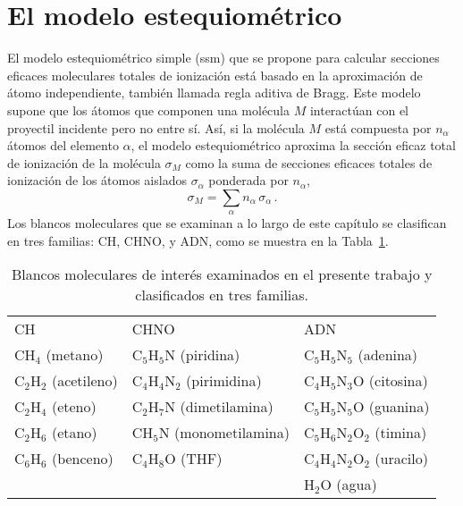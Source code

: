 \section{El modelo estequiométrico}
\label{sec:SSM}

El modelo estequiométrico simple (\acs{ssm}) que se propone para 
calcular secciones eficaces moleculares totales de ionización está 
basado en la aproximación de átomo independiente, también llamada regla 
aditiva de Bragg. Este modelo supone que los átomos que componen una 
molécula $M$ interactúan con el proyectil incidente pero no entre sí. 
Así, si la molécula $M$ está compuesta por $n_{\alpha}$ átomos del 
elemento $\alpha$, el modelo estequiométrico aproxima la sección eficaz 
total de ionización de la molécula $\sigma_M$ como la suma de secciones 
eficaces totales de ionización de los átomos aislados 
$\sigma_{\alpha}$ ponderada por $n_{\alpha}$, 
\begin{equation}
\sigma_{M}=\sum_{\alpha} n_{\alpha}\,\sigma_{\alpha}\,.  
\label{eq:sumion}
\end{equation}
Los blancos moleculares que se examinan a lo largo de este capítulo se 
clasifican en tres familias: CH, CHNO, y ADN, como se muestra en la 
Tabla~\ref{tab:families}.

\begin{table}
\begin{center}
\begin{tabular}{
>{\centering\arraybackslash}p{}
>{\centering\arraybackslash}p{}
>{\centering\arraybackslash}p{}}
\rowcolor{mydarkgray} 
CH & CHNO & ADN \\
CH$_4$ (metano) & C$_5$H$_5$N (piridina)       & C$_5$H$_5$N$_5$ (adenina) \\
\rowcolor{mygray} 
C$_2$H$_2$ (acetileno) & C$_4$H$_4$N$_2$ (pirimidina)     & C$_4$H$_5$N$_3$O (citosina) \\
C$_2$H$_4$ (eteno)     & C$_2$H$_7$N     (dimetilamina)   & C$_5$H$_5$N$_5$O (guanina) \\
\rowcolor{mygray} 
C$_2$H$_6$ (etano)     & CH$_5$N         (monometilamina) & C$_5$H$_6$N$_2$O$_2$ (timina) \\
C$_6$H$_6$ (benceno)   & C$_4$H$_8$O     (THF)            & C$_4$H$_4$N$_2$O$_2$ (uracilo) \\
\rowcolor{mygray} 
 & & H$_2$O (agua) \\
\end{tabular}
\caption[Blancos moleculares examinados y clasificados en tres 
familias.]
{Blancos moleculares de interés examinados en el presente trabajo y 
clasificados en tres familias.}
\label{tab:families}
\end{center}
\end{table}

